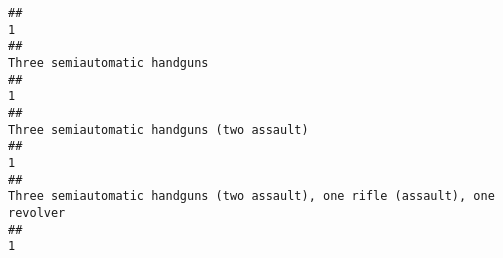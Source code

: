 \documentclass[
]{article}
\begin{document}
\begin{verbatim}
##                                                                                                                                                                                                                                                                                                                                                                                                     1 
##                                                                                                                                                                                                                                                                                                                                                                          Three semiautomatic handguns 
##                                                                                                                                                                                                                                                                                                                                                                                                     1 
##                                                                                                                                                                                                                                                                                                                                                            Three semiautomatic handguns (two assault) 
##                                                                                                                                                                                                                                                                                                                                                                                                     1 
##                                                                                                                                                                                                                                                                                                                         Three semiautomatic handguns (two assault), one rifle (assault), one revolver 
##                                                                                                                                                                                                                                                                                                                                                                                                     1 

\end{verbatim}
\end{document}
